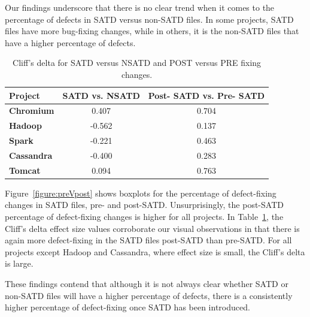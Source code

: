 Our findings underscore that there is no clear trend when it comes to the percentage of defects in SATD versus non-SATD files. In some projects, SATD files have more bug-fixing changes, while in others, it is the non-SATD files that have a higher percentage of defects.

\begin{table}[tb]
	\setlength{\tabcolsep}{.7\tabcolsep}
	\centering
	\caption{Cliff's delta for SATD versus NSATD and POST versus PRE fixing changes.}
	\begin{tabular}{l|c|c}
		\hline
		\textbf{Project}   & {\bf SATD vs. NSATD} & {\bf Post- SATD vs. Pre- SATD} \\ \hline
		\textbf{Chromium}  & 0.407          & 0.704        \\ \hline
		\textbf{Hadoop}    & -0.562         & 0.137        \\ \hline
		\textbf{Spark}     & -0.221         & 0.463        \\ \hline
		\textbf{Cassandra} & -0.400         & 0.283        \\ \hline
		\textbf{Tomcat}    & 0.094          & 0.763        \\ \hline
	\end{tabular}
	\label{table:cliff_deltas_RQ1}
\end{table}

 Figure~\ref{figure:preVpost} shows boxplots for the percentage of defect-fixing changes in SATD files, pre- and post-SATD. Unsurprisingly, the post-SATD percentage of defect-fixing changes is higher for all projects. In Table~\ref{table:cliff_deltas_RQ1}, the Cliff's delta effect size values corroborate our visual observations in that there is again more defect-fixing in the SATD files post-SATD than pre-SATD. For all projects except Hadoop and Cassandra, where effect size is small, the Cliff's delta is large.


These findings contend that although it is not always clear whether SATD or non-SATD files will have a higher percentage of defects, there is a consistently higher percentage of defect-fixing once SATD has been introduced.



